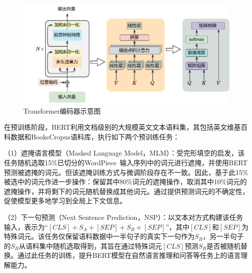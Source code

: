 \begin{figure}[htp]
   \centering
   \includegraphics[width=1\linewidth]{figures/chap2/transformer.pdf}
   \caption{Transformer编码器示意图}
   \label{transformer}
\end{figure}

在预训练阶段，BERT利用文档级别的大规模英文文本语料集，其包括英文维基百科数据和BooksCropus语料库，执行如下两个预训练任务：

（1）遮掩语言模型（Masked Language Model，MLM）：受完形填空的启发，该任务随机选取15\%已切分的WordPiece~\cite{wu2016google}输入序列中的词元进行遮掩，并使用BERT预测被遮掩的词元。但该遮掩训练方式与微调阶段存在不一致。因此，基于此15\%被选中的词元作进一步操作：保留其中80\%词元的遮掩操作，取消其中10\%词元的遮掩操作，并将剩下的词元随机替换成其他词元。通过提供预测词元的不确定性，促使模型更多地学习到全局上下文信息。

（2）下一句预测（Next Sentence Prediction，NSP）：以文本对方式构建该任务输入，表示为“$[CLS]+S_{A}+[SEP]+S_{B}+[SEP]$”，其中$[CLS]$和$[SEP]$为特殊词元。该任务仅保留语料数据中一半句子的真实下一句作为$S_{B}$，另一半句子的$S_{B}$从语料集中随机选取得到，其旨在通过特殊词元$[CLS]$预测$S_{B}$是否被随机替换。通过此任务的训练，提升BERT模型在自然语言推理和问答等任务上的语言理解能力。

